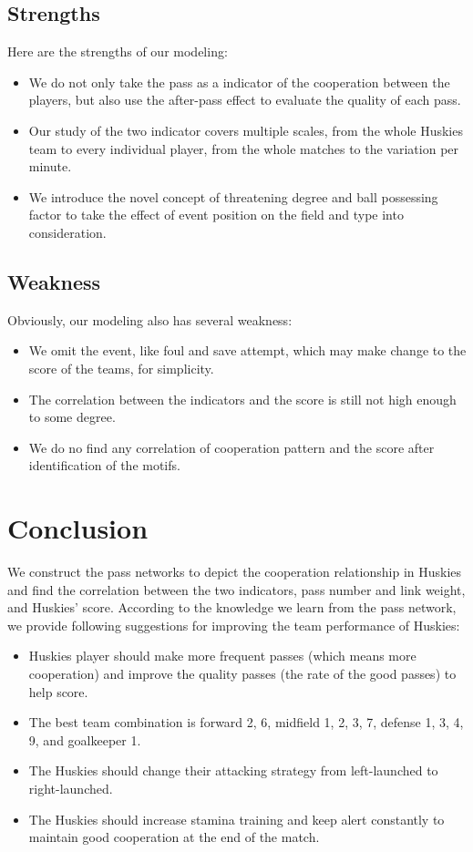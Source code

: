 \documentclass[12pt]{article}
\begin{document}
\subsection{Strengths}
Here are the strengths of our modeling:
\begin{itemize}
    \item We do not only take the pass as a indicator of the cooperation between the players, but also use the after-pass effect to evaluate the quality of each pass.
    \item Our study of the two indicator covers multiple scales, from the whole Huskies team to every individual player, from the whole matches to the variation per minute.
    \item We introduce the novel concept of threatening degree and ball possessing factor to take the effect of event position on the field and type into consideration.
\end{itemize}

\subsection{Weakness}
Obviously, our modeling also has several weakness:
\begin{itemize}
    \item We omit the event, like foul and save attempt, which may make change to the score of the teams, for simplicity.
    \item The correlation between the indicators and the score is still not high enough to some degree.
    \item We do no find any correlation of cooperation pattern and the score after identification of the motifs.
\end{itemize}

\section{Conclusion}
We construct the pass networks to depict the cooperation relationship in Huskies and find the correlation between the two indicators, pass number and link weight, and Huskies' score. According to the knowledge we learn from the pass network, we provide following suggestions for improving the team performance of Huskies:
\begin{itemize}
	\item Huskies player should make more frequent passes (which means more cooperation) and improve the quality passes (the rate of the good passes) to help score.
	\item The best team combination is forward  2, 6, midfield 1, 2, 3, 7, defense 1, 3, 4, 9, and goalkeeper 1.
	\item The Huskies should change their attacking strategy from left-launched to right-launched.
	\item The Huskies should increase stamina training and keep alert constantly to maintain good cooperation at the end of the match.
\end{itemize}
\end{document}
